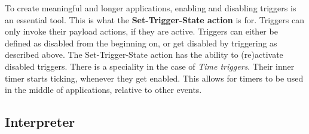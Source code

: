 To create meaningful and longer applications, enabling and disabling triggers is an essential tool. This is what the \textbf{Set-Trigger-State action} is for. Triggers can only invoke their payload actions, if they are active. Triggers can either be defined as disabled from the beginning on, or get disabled by triggering as described above. The Set-Trigger-State action has the ability to (re)activate disabled triggers. There is a speciality in the case of \textit{Time triggers}. Their inner timer starts ticking, whenever they get enabled. This allows for timers to be used in the middle of applications, relative to other events.

\subsection{Interpreter}
























